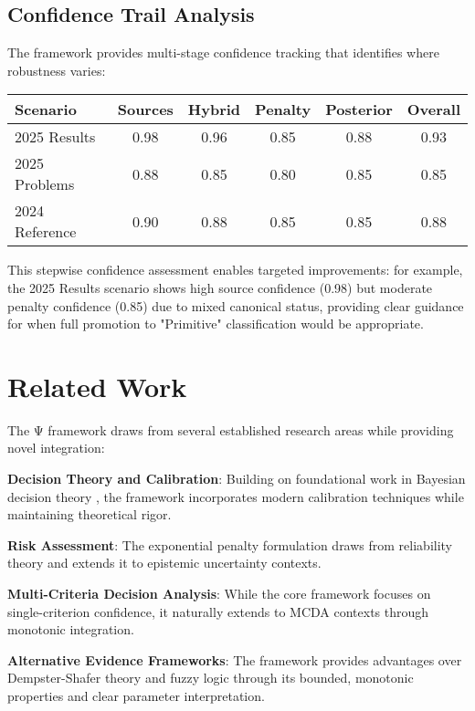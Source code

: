 \documentclass[12pt,a4paper]{article}
\begin{document}
\subsection{Confidence Trail Analysis}

The framework provides multi-stage confidence tracking that identifies where robustness varies:

\begin{center}
\begin{tabular}{@{}lccccc@{}}
\toprule
Scenario & Sources & Hybrid & Penalty & Posterior & Overall \\
\midrule
2025 Results & 0.98 & 0.96 & 0.85 & 0.88 & 0.93 \\
2025 Problems & 0.88 & 0.85 & 0.80 & 0.85 & 0.85 \\
2024 Reference & 0.90 & 0.88 & 0.85 & 0.85 & 0.88 \\
\bottomrule
\end{tabular}
\end{center}

This stepwise confidence assessment enables targeted improvements: for example, the 2025 Results scenario shows high source confidence (0.98) but moderate penalty confidence (0.85) due to mixed canonical status, providing clear guidance for when full promotion to "Primitive" classification would be appropriate.

\section{Related Work}

The Ψ framework draws from several established research areas while providing novel integration:

\textbf{Decision Theory and Calibration}: Building on foundational work in Bayesian decision theory \citep{Berger1985, Savage1954}, the framework incorporates modern calibration techniques \citep{GneitingRaftery2007, Guo2017} while maintaining theoretical rigor.

\textbf{Risk Assessment}: The exponential penalty formulation draws from reliability theory \citep{Cox1972, BarlowProschan1981} and extends it to epistemic uncertainty contexts.

\textbf{Multi-Criteria Decision Analysis}: While the core framework focuses on single-criterion confidence, it naturally extends to MCDA contexts \citep{KeeneyRaiffa1993, Saaty1980} through monotonic integration.

\textbf{Alternative Evidence Frameworks}: The framework provides advantages over Dempster-Shafer theory \citep{Shafer1976} and fuzzy logic \citep{Zadeh1965} through its bounded, monotonic properties and clear parameter interpretation.
\end{document}
